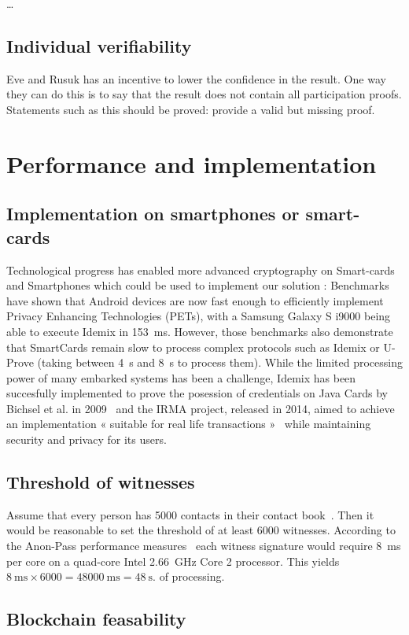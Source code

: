 \dots

\subsection{Individual verifiability}

Eve and Rusuk has an incentive to lower the confidence in the result.
One way they can do this is to say that the result does not contain all 
participation proofs.
Statements such as this should be proved: provide a valid but missing proof.

\section{Performance and implementation}

\subsection{Implementation on smartphones or smart-cards}
Technological progress has enabled more advanced cryptography on Smart-cards and Smartphones which could be used to implement our solution : Benchmarks~\cite{Benchmarking} have shown that Android devices are now fast enough to efficiently implement Privacy Enhancing Technologies (PETs), with a Samsung Galaxy S i9000 being able to execute Idemix in  \SI{153}{\milli\second}. However, those benchmarks also demonstrate that SmartCards remain slow to process complex protocols such as Idemix or U-Prove (taking between \SI{4}{\second} and \SI{8}{\second} to process them). While the limited processing power of many embarked systems has been a challenge, Idemix has been succesfully implemented to prove the posession of credentials on Java Cards by Bichsel et al. in 2009~\cite{Bichsel} and the IRMA project, released in 2014, aimed to achieve an implementation « suitable for real life transactions »~\cite{IRMA} while maintaining security and privacy for its users. 

\subsection{Threshold of witnesses}

Assume that every person has 5000 contacts in their contact 
book~\cite{DifficultyOfPrivateContactDiscovery}.
Then it would be reasonable to set the threshold of at least 6000 witnesses.
According to the Anon-Pass performance measures~\cite{AnonPass} each witness 
signature would require \SI{8}{\milli\second} per core on a quad-core Intel 
\SI{2.66}{\giga\hertz} Core 2 processor.
This yields \(
  \SI{8}{\milli\second}\times 6000 = \SI{48000}{\milli\second} = 
  \SI{48}{\second}.
\) of processing.

\subsection{Blockchain feasability}